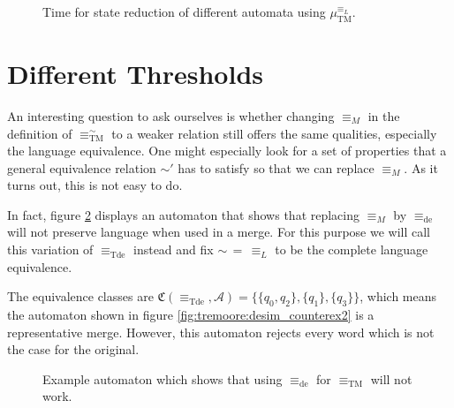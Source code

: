 \begin{figure}
\begin{minipage}{0.49\textwidth}
		\caption{Time for state reduction of different automata using $\mu_\text{TM}^{\equiv_L}$.}
		\label{fig:tremoore:empirical_time}
	\end{minipage}
\end{figure}




\section{Different Thresholds}

An interesting question to ask ourselves is whether changing $\equiv_M$ in the definition of $\equiv_\text{TM}^\sim$ to a weaker relation still offers the same qualities, especially the language equivalence. One might especially look for a set of properties that a general equivalence relation $\sim'$ has to satisfy so that we can replace $\equiv_M$. As it turns out, this is not easy to do.

In fact, figure \ref{fig:tremoore:desim_counterex1} displays an automaton that shows that replacing $\equiv_M$ by $\equiv_\text{de}$ will not preserve language when used in a merge. For this purpose we will call this variation of $\equiv_\text{Tde}$ instead and fix $\sim \,=\, \equiv_L$ to be the complete language equivalence.

The equivalence classes are $\mathfrak{C}(\equiv_\text{Tde}, \mathcal{A}) = \{ \{q_0, q_2\}, \{q_1\}, \{q_3\} \}$, which means the automaton shown in figure \ref{fig:tremoore:desim_counterex2} is a representative merge. However, this automaton rejects every word which is not the case for the original.

\begin{figure}
\centering
{}
\caption{Example automaton which shows that using $\equiv_\text{de}$ for $\equiv_\text{TM}$ will not work.}
\label{fig:tremoore:desim_counterex1}
\end{figure}

